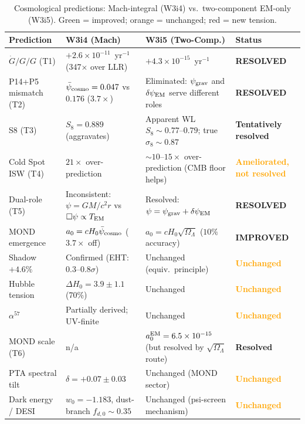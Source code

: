 \documentclass[11pt]{article}
\newcommand{\ee}[1]{\times 10^{#1}}
\newcommand{\psicosmo}{\bar{\psi}_{\rm cosmo}}
\newcommand{\Gdot}{\dot{G}/G}
\begin{document}
\begin{table}[h!]
\centering
\caption{Cosmological predictions: Mach-integral (W3i4) vs.\ two-component
EM-only (W3i5). Green = improved; orange = unchanged; red = new tension.}
\label{tab:cosmo-summary}
\begin{tabular}{p{3.5cm}p{3.5cm}p{3.5cm}p{2.5cm}}
\toprule
\textbf{Prediction} & \textbf{W3i4 (Mach)} & \textbf{W3i5 (Two-Comp.)} & \textbf{Status} \\
\midrule
$\Gdot/G$ (T1) & $+2.6\ee{-11}$~yr$^{-1}$ (347$\times$ over LLR) &
  $+4.3\ee{-15}$~yr$^{-1}$ & \textcolor{green!50!black}{\textbf{RESOLVED}} \\
\addlinespace
P14+P5 mismatch (T2) & $\psicosmo = 0.047$ vs $0.176$ ($3.7\times$) &
  Eliminated: $\psi_{\rm grav}$ and $\delta\psi_{\rm EM}$ serve different
  roles & \textcolor{green!50!black}{\textbf{RESOLVED}} \\
\addlinespace
S8 (T3) & $S_8 = 0.889$ (aggravates) &
  Apparent WL $S_8 \sim 0.77$--$0.79$; true $\sigma_8 \sim 0.87$ &
  \textcolor{green!50!black}{\textbf{Tentatively resolved}} \\
\addlinespace
Cold Spot ISW (T4) & $21\times$ over-prediction &
  $\sim 10$--$15\times$ over-prediction (CMB floor helps) &
  \textcolor{orange}{\textbf{Ameliorated, not resolved}} \\
\addlinespace
Dual-role (T5) & Inconsistent: $\psi = GM/c^2r$ vs $\Box\psi \propto T_{\rm EM}$ &
  Resolved: $\psi = \psi_{\rm grav} + \delta\psi_{\rm EM}$ &
  \textcolor{green!50!black}{\textbf{RESOLVED}} \\
\addlinespace
MOND emergence & $a_0 = cH_0\psicosmo$ ($3.7\times$ off) &
  $a_0 = cH_0\sqrt{\Omega_\Lambda}$ ($10\%$ accuracy) &
  \textcolor{green!50!black}{\textbf{IMPROVED}} \\
\addlinespace
Shadow $+4.6\%$ & Confirmed (EHT: $0.3$--$0.8\sigma$) &
  Unchanged (equiv.\ principle) & \textcolor{orange}{\textbf{Unchanged}} \\
\addlinespace
Hubble tension & $\Delta H_0 = 3.9\pm1.1$ (70\%) &
  Unchanged & \textcolor{orange}{\textbf{Unchanged}} \\
\addlinespace
$\alpha^{57}$ & Partially derived; UV-finite &
  Unchanged & \textcolor{orange}{\textbf{Unchanged}} \\
\addlinespace
MOND scale (T6) & n/a &
  $a_0^{\rm EM} = 6.5\ee{-15}$ (but resolved by $\sqrt{\Omega_\Lambda}$
  route) & \textcolor{green!50!black}{\textbf{Resolved}} \\
\addlinespace
PTA spectral tilt & $\delta = +0.07\pm 0.03$ &
  Unchanged (MOND sector) & \textcolor{orange}{\textbf{Unchanged}} \\
\addlinespace
Dark energy / DESI & $w_0 = -1.183$, dust-branch $f_{d,0} \sim 0.35$ &
  Unchanged (psi-screen mechanism) & \textcolor{orange}{\textbf{Unchanged}} \\
\bottomrule
\end{tabular}
\end{table}
\end{document}
